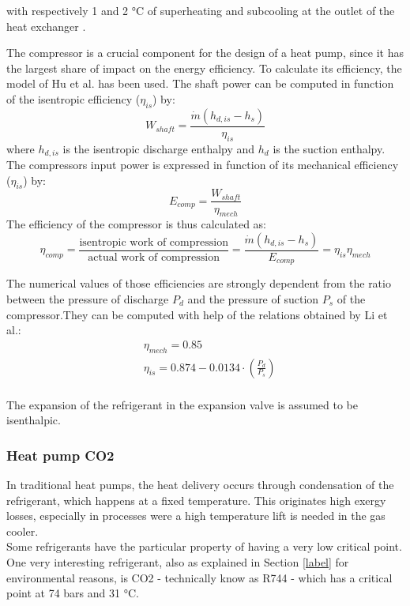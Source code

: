 \documentclass{article}
\begin{document}
with respectively 1 and 2 \si{\celsius} of superheating and subcooling at the outlet of the heat exchanger \cite{}.

The compressor is a crucial component for the design of a heat pump, since it has the largest share of impact on the energy efficiency. To calculate its efficiency, the model of Hu et al.\cite{huExtremumSeekingControl2015} has been used. The shaft power can be computed in function of the isentropic efficiency ($\eta_{is}$) by:
\begin{equation}
W_{shaft} = \frac{\dot{m}(h_{d,is}-h_{s})}{\eta_{is}} 
\end{equation}
where $h_{d,is}$ is the isentropic discharge enthalpy and $h_{d}$ is the suction enthalpy. The compressors input power is expressed in function of its mechanical efficiency ($\eta_{is}$) by:
\begin{equation}
E_{comp} = \frac{W_{shaft}}{\eta_{mech}}  
\end{equation}
The efficiency of the compressor is thus calculated as:
\begin{equation}
\eta_{comp} = \frac{\text{isentropic work of compression}}{\text{actual work of compression}} = \frac{\dot{m}(h_{d,is}-h_{s})}{E_{comp}} = \eta_{is}\eta_{mech} 
\end{equation}

The numerical values of those efficiencies are strongly dependent from the ratio between the pressure of discharge $P_{d}$ and the pressure of suction $P_{s}$ of the compressor.They can be computed with help of the relations obtained by Li et al.\cite{liPerformanceCharacteristicsR1234yf2014}:
\begin{align}
& \eta_{mech} = 0.85\\
& \eta_{is} = 0.874-0.0134\cdot(\frac{P_{d}}{P_{s}})\\
\end{align}
		
The expansion of the refrigerant in the expansion valve is assumed to be isenthalpic. 


\subsubsection{Heat pump CO2}\label{sss:hp_CO2}
In traditional heat pumps, the heat delivery occurs through condensation of the refrigerant, which happens at a fixed temperature. This originates high exergy losses, especially in processes were a high temperature lift is needed in the gas cooler.\\
Some refrigerants have the particular property of having a very low critical point. One very interesting refrigerant, also as explained in Section \ref{label} for environmental reasons, is CO2 - technically know as R744 - which has a critical point at 74 bars and 31 \si{\celsius}\cite{cavalliniPROPERTIESCO2REFRIGERANT}.
\end{document}
